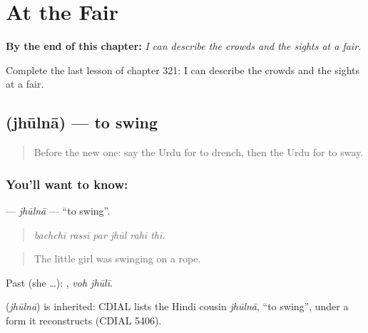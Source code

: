 
\chapter{At the Fair}
\label{ch:ur-at-the-fair}

\begin{chapteropening}
\textbf{By the end of this chapter:} \emph{I can describe the crowds and the sights at a fair.}

Complete the last lesson of chapter 321: I can describe the crowds and the sights at a fair.
\end{chapteropening}

\section[\texorpdfstring{\ur{جھولنا} (jhūlnā)}{جھولنا (jhūlnā)}]{ (jhūlnā) — to swing}

\label{lesson:UR-C321-jhulna}



\begin{quote}
Before the new one: say the Urdu for to drench, then the Urdu for to sway.
\end{quote}

\subsection*{You'll want to know: }
\textbf{} — \emph{jhūlnā} — \textquotedblleft{}to swing\textquotedblright{}.

\begin{quote}
     
\end{quote}

\begin{quote}
\emph{bachchī rassī par jhūl rahī thī.}
\end{quote}

\begin{quote}
The little girl was swinging on a rope.
\end{quote}

Past (she …):  , \emph{voh jhūlī}.

\begin{cousinweb}
\textbf{} (\emph{jhūlnā}) is inherited: CDIAL lists the Hindi cousin \emph{jhūlnā}, \textquotedblleft{}to swing\textquotedblright{}, under a form it reconstructs (CDIAL 5406).
\end{cousinweb}

